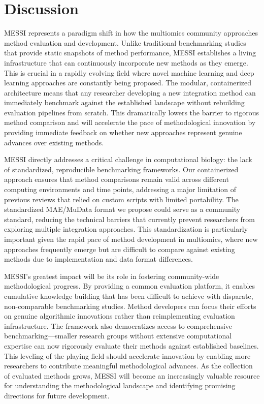 \documentclass[
]{article}
\begin{document}
\hypertarget{discussion}{%
\section{Discussion}\label{discussion}}

MESSI represents a paradigm shift in how the multiomics community approaches method evaluation and development. Unlike traditional benchmarking studies that provide static snapshots of method performance, MESSI establishes a living infrastructure that can continuously incorporate new methods as they emerge. This is crucial in a rapidly evolving field where novel machine learning and deep learning approaches are constantly being proposed. The modular, containerized architecture means that any researcher developing a new integration method can immediately benchmark against the established landscape without rebuilding evaluation pipelines from scratch. This dramatically lowers the barrier to rigorous method comparison and will accelerate the pace of methodological innovation by providing immediate feedback on whether new approaches represent genuine advances over existing methods.

MESSI directly addresses a critical challenge in computational biology: the lack of standardized, reproducible benchmarking frameworks. Our containerized approach ensures that method comparisons remain valid across different computing environments and time points, addressing a major limitation of previous reviews that relied on custom scripts with limited portability. The standardized MAE/MuData format we propose could serve as a community standard, reducing the technical barriers that currently prevent researchers from exploring multiple integration approaches. This standardization is particularly important given the rapid pace of method development in multiomics, where new approaches frequently emerge but are difficult to compare against existing methods due to implementation and data format differences.

MESSI's greatest impact will be its role in fostering community-wide methodological progress. By providing a common evaluation platform, it enables cumulative knowledge building that has been difficult to achieve with disparate, non-comparable benchmarking studies. Method developers can focus their efforts on genuine algorithmic innovations rather than reimplementing evaluation infrastructure. The framework also democratizes access to comprehensive benchmarking---smaller research groups without extensive computational expertise can now rigorously evaluate their methods against established baselines. This leveling of the playing field should accelerate innovation by enabling more researchers to contribute meaningful methodological advances. As the collection of evaluated methods grows, MESSI will become an increasingly valuable resource for understanding the methodological landscape and identifying promising directions for future development.
\end{document}
